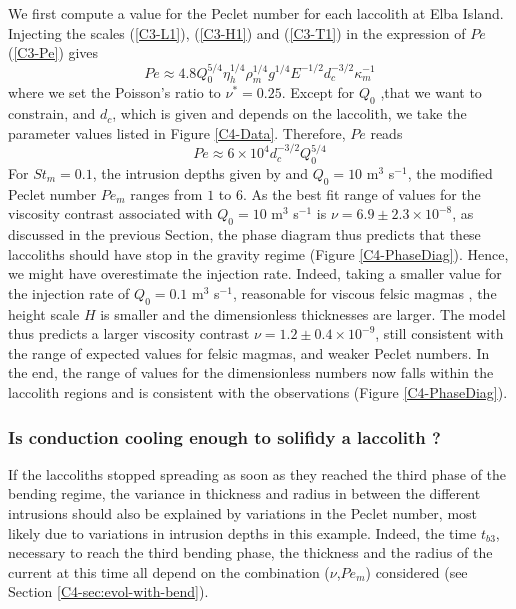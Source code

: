 We first compute  a value for the Peclet number  for each laccolith at
Elba  Island. Injecting  the scales  (\ref{C3-L1}), (\ref{C3-H1})  and
(\ref{C3-T1}) in the expression of $Pe$ (\ref{C3-Pe}) gives
\begin{equation}
  Pe \approx 4.8 Q_{0}^{5/4}\eta_{h}^{1/4}\rho_m^{1/4}g^{1/4}E^{-1/2} d_c^{-3/2} \kappa_m^{-1}
\end{equation}
where we  set the  Poisson's ratio to  $\nu^*=0.25$. Except  for $Q_0$
,that we want  to constrain, and $d_c$, which is  given and depends on
the  laccolith,  we  take  the   parameter  values  listed  in  Figure
\ref{C4-Data}.  Therefore, $Pe$ reads
\begin{equation}
  Pe \approx 6\times10^4 d_c^{-3/2} Q_0^{5/4}
  \label{PeExpre}
\end{equation}
For $St_m  =0.1$, the intrusion depths  given by \citet{Rocchi:2002jy}
and  $Q_0 =10$  m$^{3}$ s$^{-1}$,  the modified  Peclet number  $Pe_m$
ranges from  $1$ to  $6$.  As  the best  fit range  of values  for the
viscosity  contrast  associated  with  $Q_0=10$  m$^{3}$  s$^{-1}$  is
$\nu  = 6.9\pm  2.3  \times  10^{-8}$, as  discussed  in the  previous
Section, the phase diagram thus  predicts that these laccoliths should
have stop in the gravity regime (Figure \ref{C4-PhaseDiag}). Hence, we
might have overestimate the injection  rate.  Indeed, taking a smaller
value for the injection rate of $Q_0=0.1$ m$^{3}$ s$^{-1}$, reasonable
for viscous felsic magmas  \citep{Harris:2000jd}, the height scale $H$
is smaller  and the dimensionless  thicknesses are larger.   The model
thus       predicts       a      larger       viscosity       contrast
$\nu=1.2\pm0.4\times  10^{-9}$, still  consistent  with  the range  of
expected values for felsic magmas,  and weaker Peclet numbers.  In the
end,  the range  of values  for  the dimensionless  numbers now  falls
within the laccolith  regions and is consistent  with the observations
(Figure \ref{C4-PhaseDiag}).

\subsubsection*{Is   conduction   cooling   enough   to   solifidy   a
  laccolith ?}

If the laccoliths stopped spreading as  soon as they reached the third
phase of the  bending regime, the variance in thickness  and radius in
between  the   different  intrusions  should  also   be  explained  by
variations  in the  Peclet number,  most likely  due to  variations in
intrusion  depths  in  this   example.   Indeed,  the  time  $t_{b3}$,
necessary  to reach  the third  bending phase,  the thickness  and the
radius  of the  current at  this time  all depend  on the  combination
($\nu$,$Pe_m$) considered (see Section \ref{C4-sec:evol-with-bend}).

